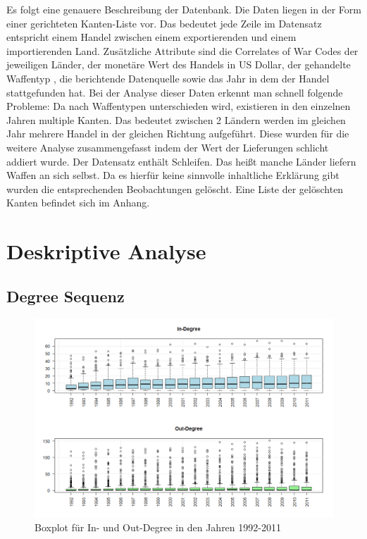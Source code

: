 \documentclass[a4paper,ngerman,oneside,titlepage,bibliography=totoc,11pt]{scrreprt}
\begin{document}
Es folgt eine genauere Beschreibung der Datenbank. Die Daten liegen in der Form einer gerichteten Kanten-Liste vor. Das bedeutet jede Zeile im Datensatz entspricht einem Handel zwischen einem exportierenden und einem importierenden Land. Zusätzliche Attribute sind die Correlates of War Codes der jeweiligen Länder, der monetäre Wert des Handels in US Dollar, der gehandelte Waffentyp , die berichtende Datenquelle sowie das Jahr in dem der Handel stattgefunden hat.
Bei der Analyse dieser Daten erkennt man schnell folgende Probleme:
Da nach Waffentypen unterschieden wird, existieren in den einzelnen Jahren multiple Kanten. Das bedeutet zwischen 2 Ländern werden im gleichen Jahr mehrere Handel in der gleichen Richtung aufgeführt. Diese wurden für die weitere Analyse zusammengefasst indem der Wert der Lieferungen schlicht addiert wurde.
Der Datensatz enthält Schleifen. Das heißt manche Länder liefern Waffen an sich selbst. Da es hierfür keine sinnvolle inhaltliche Erklärung gibt wurden die entsprechenden Beobachtungen gelöscht. Eine Liste der gelöschten Kanten befindet sich im Anhang.

\chapter{Deskriptive Analyse}

\section{Degree Sequenz}
\label{sec:degree}
\begin{figure}[h]
	\centering
		\includegraphics[width=1.00\textwidth]{Grafiken/ts_degree.png}
	\caption{Boxplot für In- und Out-Degree in den Jahren 1992-2011}
	\label{fig:ts_degree}
\end{figure}
\end{document}
